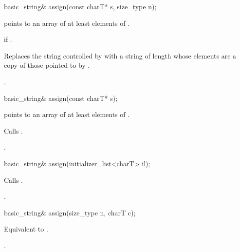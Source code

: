 %
%
\begin{itemdecl}
basic_string& assign(const charT* s, size_type n);
\end{itemdecl}

\begin{itemdescr}
\pnum
\requires {} points to an array of at least  elements of .

\pnum
\throws {} if .

\pnum
\effects Replaces the string controlled by  with a string
of length  whose elements are a copy of those pointed to by .

\pnum
\returns
{}.
\end{itemdescr}

%
%
\begin{itemdecl}
basic_string& assign(const charT* s);
\end{itemdecl}

\begin{itemdescr}
\pnum
\requires {} points to an array of at least 
elements of .

\pnum
\effects Calls .

\pnum
\returns
{}.
\end{itemdescr}

%
%
\begin{itemdecl}
basic_string& assign(initializer_list<charT> il);
\end{itemdecl}

\begin{itemdescr}
\pnum
\effects Calls .

\pnum
{}.
\end{itemdescr}


%
\begin{itemdecl}
basic_string& assign(size_type n, charT c);
\end{itemdecl}

\begin{itemdescr}
\pnum
\effects Equivalent to .

\pnum
\returns
{}.
\end{itemdescr}

